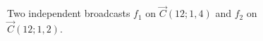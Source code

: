 \documentclass[10pt,a4paper]{article}
\begin{document}
\begin{figure}[htbp]
    \centering
    
     \hfill
    
    \caption{Two independent broadcasts $f_1$ on $\overrightarrow{C}(12;1,4)$ and $f_2$ on $\overrightarrow{C}(12;1,2)$.}
    \label{fig:two_broadasts}
\end{figure}
\end{document}
